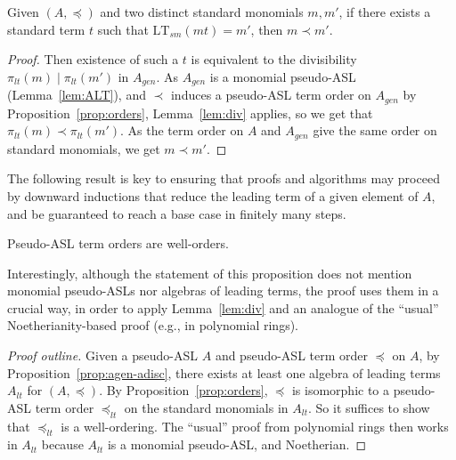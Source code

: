 \documentclass[11pt,reqno]{amsart}
\newcommand{\divides}{\mid}
\newcommand{\ltsm}{\text{LT}_{sm}}
\theoremstyle{definition}
\numberwithin{equation}{section}
\begin{document}
\begin{corollary}
\label{cor:divisor-less-than-dividend}
Given $(A, \preceq)$ and two distinct standard monomials $m,m'$, if there exists a standard term $t$ such that $\ltsm(mt) = m'$, then $m \prec m'$. 
\end{corollary}

\begin{proof}
Then existence of such a $t$ is equivalent to the divisibility $\pi_{lt}(m) \divides \pi_{lt}(m')$ in $A_{gen}$. As $A_{gen}$ is a monomial pseudo-ASL (Lemma~\ref{lem:ALT}), and $\prec$ induces a pseudo-ASL term order on $A_{gen}$ by Proposition~\ref{prop:orders}, Lemma~\ref{lem:div} applies, so we get that $\pi_{lt}(m) \prec \pi_{lt}(m')$. As the term order on $A$ and $A_{gen}$ give the same order on standard monomials, we get $m \prec m'$.
\end{proof}

The following result is key to ensuring that proofs and algorithms may proceed by downward inductions that reduce the leading term of a given element of $A$, and be guaranteed to reach a base case in finitely many steps. 

\begin{proposition} \label{prop:well-order}
Pseudo-ASL term orders are well-orders.
\end{proposition}

Interestingly, although the statement of this proposition does not mention monomial pseudo-ASLs nor algebras of leading terms, the proof uses them in a crucial way, in order to apply Lemma~\ref{lem:div} and an analogue of the ``usual'' Noetherianity-based proof (e.g., in polynomial rings).

\begin{proof}[Proof outline]
Given a pseudo-ASL $A$ and pseudo-ASL term order $\preceq$ on $A$, by Proposition~\ref{prop:agen-adisc}, there exists at least one algebra of leading terms $A_{lt}$ for $(A,\preceq)$. By Proposition~\ref{prop:orders}, $\preceq$ is isomorphic to a pseudo-ASL term order $\preceq_{lt}$ on the standard monomials in $A_{lt}$. So it suffices to show that $\preceq_{lt}$ is a well-ordering. The ``usual'' proof from polynomial rings then works in $A_{lt}$ because $A_{lt}$ is a monomial pseudo-ASL, and Noetherian.
\end{proof}
\end{document}
